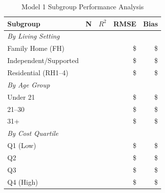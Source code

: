 \begin{table}[h]
\centering
\caption{Model 1 Subgroup Performance Analysis}
\begin{tabular}{lrrrr}
\toprule
\textbf{Subgroup} & \textbf{N} & \textbf{$R^2$} & \textbf{RMSE} & \textbf{Bias} \\
\midrule
\multicolumn{5}{l}{\textit{By Living Setting}} \\
Family Home (FH) & \ModelOneSubgrouplivingFHN{} & \ModelOneSubgrouplivingFHRSquared{} & \$\ModelOneSubgrouplivingFHRMSE{} & \$\ModelOneSubgrouplivingFHBias{} \\
Independent/Supported & \ModelOneSubgrouplivingILSLN{} & \ModelOneSubgrouplivingILSLRSquared{} & \$\ModelOneSubgrouplivingILSLRMSE{} & \$\ModelOneSubgrouplivingILSLBias{} \\
Residential (RH1--4) & \ModelOneSubgrouplivingRHOneToFourN{} & \ModelOneSubgrouplivingRHOneToFourRSquared{} & \$\ModelOneSubgrouplivingRHOneToFourRMSE{} & \$\ModelOneSubgrouplivingRHOneToFourBias{} \\
\midrule
\multicolumn{5}{l}{\textit{By Age Group}} \\
Under 21 & \ModelOneSubgroupageAgeUnderTwentyOneN{} & \ModelOneSubgroupageAgeUnderTwentyOneRSquared{} & \$\ModelOneSubgroupageAgeUnderTwentyOneRMSE{} & \$\ModelOneSubgroupageAgeUnderTwentyOneBias{} \\
21--30 & \ModelOneSubgroupageAgeTwentyOneToThirtyN{} & \ModelOneSubgroupageAgeTwentyOneToThirtyRSquared{} & \$\ModelOneSubgroupageAgeTwentyOneToThirtyRMSE{} & \$\ModelOneSubgroupageAgeTwentyOneToThirtyBias{} \\
31+ & \ModelOneSubgroupageAgeThirtyOnePlusN{} & \ModelOneSubgroupageAgeThirtyOnePlusRSquared{} & \$\ModelOneSubgroupageAgeThirtyOnePlusRMSE{} & \$\ModelOneSubgroupageAgeThirtyOnePlusBias{} \\
\midrule
\multicolumn{5}{l}{\textit{By Cost Quartile}} \\
Q1 (Low) & \ModelOneSubgroupcostQOneLowN{} & \ModelOneSubgroupcostQOneLowRSquared{} & \$\ModelOneSubgroupcostQOneLowRMSE{} & \$\ModelOneSubgroupcostQOneLowBias{} \\
Q2 & \ModelOneSubgroupcostQTwoN{} & \ModelOneSubgroupcostQTwoRSquared{} & \$\ModelOneSubgroupcostQTwoRMSE{} & \$\ModelOneSubgroupcostQTwoBias{} \\
Q3 & \ModelOneSubgroupcostQThreeN{} & \ModelOneSubgroupcostQThreeRSquared{} & \$\ModelOneSubgroupcostQThreeRMSE{} & \$\ModelOneSubgroupcostQThreeBias{} \\
Q4 (High) & \ModelOneSubgroupcostQFourHighN{} & \ModelOneSubgroupcostQFourHighRSquared{} & \$\ModelOneSubgroupcostQFourHighRMSE{} & \$\ModelOneSubgroupcostQFourHighBias{} \\
\bottomrule
\end{tabular}
\end{table}

